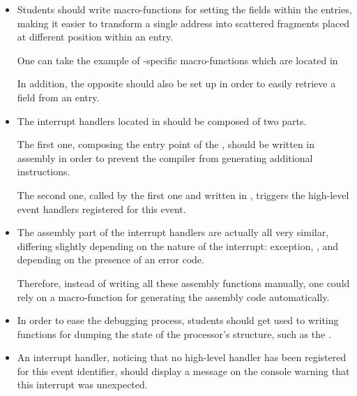 \begin{itemize}
  \item
    Students should write macro-functions for setting the fields within
    the  entries, making it easier to transform a single address
    into scattered fragments placed at different position within an entry.

    \-

    One can take the example of -specific macro-functions
    which are located in \\

    \-

    In addition, the opposite should also be set up in order to easily
    retrieve a field from an  entry.
  \item
    The interrupt handlers located in  should be
    composed of two parts.

    \-

    The first one, composing the entry point of the , should be written in assembly in order to prevent
    the compiler from generating additional instructions.

    \-

    The second one, called by the first one and written in , triggers
    the high-level event handlers registered for this event.
  \item
    The assembly part of the interrupt handlers are actually all very similar,
    differing slightly depending on the nature of the interrupt: exception,
    ,  \etc{} and depending on the presence of an
    error code.

    \-

    Therefore, instead of writing all these assembly functions manually,
    one could rely on a macro-function for generating the assembly
    code automatically.
  \item
    In order to ease the debugging process, students should get used to
    writing functions for dumping the state of the processor's structure,
    such as the .
  \item
    An interrupt handler, noticing that no high-level handler has been
    registered for this event identifier, should display a message on the
    console warning that this interrupt was unexpected.

    \-


\end{itemize}
